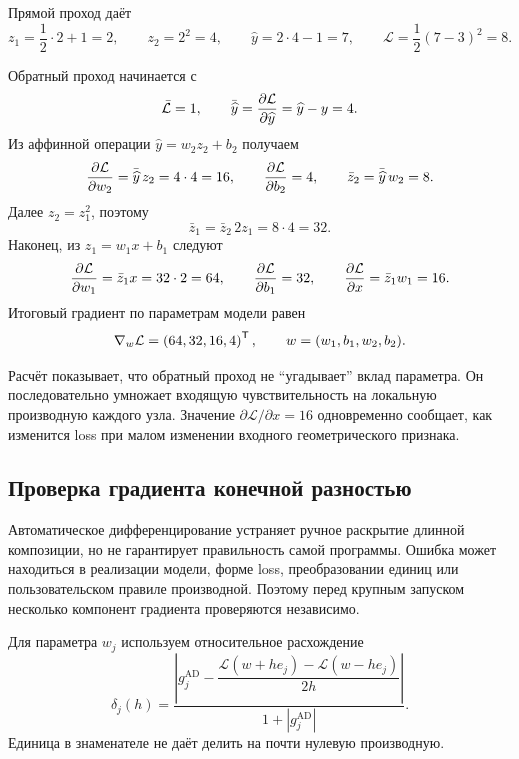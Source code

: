 Прямой проход даёт
\begin{equation}
 z_1=\frac12\cdot2+1=2,
 \qquad
 z_2=2^2=4,
 \qquad
 \widehat y=2\cdot4-1=7,
 \qquad
 \mathcal L=\frac12(7-3)^2=8.
\end{equation}

Обратный проход начинается с
\begin{equation}
 \bar{\mathcal L}=1,
 \qquad
 \bar{\widehat y}
 =
 \frac{\partial \mathcal L}{\partial \widehat y}
 =
 \widehat y-y
 =4.
\end{equation}
Из аффинной операции $\widehat y=w_2z_2+b_2$ получаем
\begin{equation}
 \frac{\partial \mathcal L}{\partial w_2}
 =
 \bar{\widehat y}\,z_2
 =4\cdot4=16,
 \qquad
 \frac{\partial \mathcal L}{\partial b_2}=4,
 \qquad
 \bar z_2
 =
 \bar{\widehat y}\,w_2
 =8.
\end{equation}
Далее $z_2=z_1^2$, поэтому
\begin{equation}
 \bar z_1
 =
 \bar z_2\,2z_1
 =8\cdot4
 =32.
\end{equation}
Наконец, из $z_1=w_1x+b_1$ следуют
\begin{equation}
 \frac{\partial \mathcal L}{\partial w_1}
 =
 \bar z_1 x
 =32\cdot2=64,
 \qquad
 \frac{\partial \mathcal L}{\partial b_1}=32,
 \qquad
 \frac{\partial \mathcal L}{\partial x}
 =
 \bar z_1w_1
 =16.
\end{equation}
Итоговый градиент по параметрам модели равен
\begin{equation}
 \nabla_w\mathcal L
 =
 \left(
 64,
 32,
 16,
 4
 \right)^{\mathsf{T}},
 \qquad
 w=(w_1,b_1,w_2,b_2).
\end{equation}

Расчёт показывает, что обратный проход не ``угадывает'' вклад параметра. Он последовательно умножает входящую чувствительность на локальную производную каждого узла. Значение $\partial\mathcal L/\partial x=16$ одновременно сообщает, как изменится loss при малом изменении входного геометрического признака.

\subsection{Проверка градиента конечной разностью}
Автоматическое дифференцирование устраняет ручное раскрытие длинной композиции, но не гарантирует правильность самой программы. Ошибка может находиться в реализации модели, форме loss, преобразовании единиц или пользовательском правиле производной. Поэтому перед крупным запуском несколько компонент градиента проверяются независимо.

Для параметра $w_j$ используем относительное расхождение
\begin{equation}
 \delta_j(h)
 =
 \frac{
 \left|
 g_j^{\mathrm{AD}}
 -
 \dfrac{\mathcal L(w+h e_j)-\mathcal L(w-h e_j)}{2h}
 \right|
 }{
 1+|g_j^{\mathrm{AD}}|
 }.
\end{equation}
Единица в знаменателе не даёт делить на почти нулевую производную.

